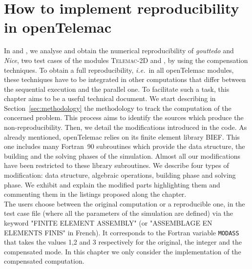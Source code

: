 \newcommand{\red}{\color{red}}
\newcommand{\ie}{{\it i.e.}~}
\newcommand{\Hilight}{\makebox[0pt][l]{\color{babypink}\rule[-2pt]{\linewidth}{10pt}}}
\chapter{How to implement reproducibility in openTelemac}
\label{ref:reprod_guide}
%
%
In \cite{LaND15} and \cite{LaND16}, we analyse and obtain the numerical reproducibility  
of \textit{gouttedo} and \textit{Nice}, two test cases of the modules {{\scshape Telemac-2D}\xspace}
and \tomawac, by using the compensation techniques. 
To obtain a full reproducibility, \ie in all openTelemac
modules, these techniques have 
to be integrated in other computations that differ between the sequential
execution and the parallel one. 
To facilitate such a task, this chapter aims to be a useful technical 
document.
%
We start describing in Section~\ref{sec:methodology} the methodology to
track the computation of the concerned problem. This process
aims to identify the sources which produce the non-reproducibility.
Then, we detail the modifications introduced in the code.
As already mentioned, openTelemac relies on its finite element library BIEF.
This one includes many Fortran~90 subroutines  
which provide the data structure, the building and 
the solving phases of the simulation.
Almost all our modifications have been restricted
to these library subroutines.
We describe four types of modification: data structure,
algebraic operations, building phase and solving phase. 
We exhibit and explain the modified parts highlighting them and commenting them in 
the listings proposed along the chapter.\\
%
%
The users choose between the original computation or a reproducible one, 
in the test case file (where all the parameters of the simulation are defined) 
via the keyword "FINITE ELEMENT ASSEMBLY"
(or "ASSEMBLAGE EN ELEMENTS FINIS" in French).
It corresponds to the Fortran variable \texttt{MODASS} 
that takes the values 1,2 and 3 respectively for the original, 
the integer and the compensated mode.
%
In this chapter we only consider the implementation of 
the compensated computation.
%
